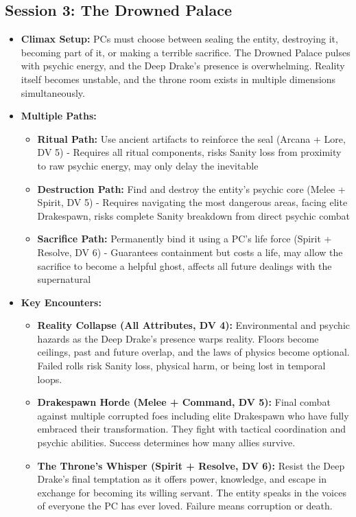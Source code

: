 \documentclass[11pt]{article}
\begin{document}
\subsection{Session 3: The Drowned Palace}
\begin{itemize}
\item \textbf{Climax Setup:} PCs must choose between sealing the entity, destroying it, becoming part of it, or making a terrible sacrifice. The Drowned Palace pulses with psychic energy, and the Deep Drake's presence is overwhelming. Reality itself becomes unstable, and the throne room exists in multiple dimensions simultaneously.
\item \textbf{Multiple Paths:}
  \begin{itemize}
  \item \textbf{Ritual Path:} Use ancient artifacts to reinforce the seal (Arcana + Lore, DV 5) - Requires all ritual components, risks Sanity loss from proximity to raw psychic energy, may only delay the inevitable
  \item \textbf{Destruction Path:} Find and destroy the entity's psychic core (Melee + Spirit, DV 5) - Requires navigating the most dangerous areas, facing elite Drakespawn, risks complete Sanity breakdown from direct psychic combat
  \item \textbf{Sacrifice Path:} Permanently bind it using a PC's life force (Spirit + Resolve, DV 6) - Guarantees containment but costs a life, may allow the sacrifice to become a helpful ghost, affects all future dealings with the supernatural
  \end{itemize}
\item \textbf{Key Encounters:}
  \begin{itemize}
  \item \textbf{Reality Collapse (All Attributes, DV 4):} Environmental and psychic hazards as the Deep Drake's presence warps reality. Floors become ceilings, past and future overlap, and the laws of physics become optional. Failed rolls risk Sanity loss, physical harm, or being lost in temporal loops.
  \item \textbf{Drakespawn Horde (Melee + Command, DV 5):} Final combat against multiple corrupted foes including elite Drakespawn who have fully embraced their transformation. They fight with tactical coordination and psychic abilities. Success determines how many allies survive.
  \item \textbf{The Throne's Whisper (Spirit + Resolve, DV 6):} Resist the Deep Drake's final temptation as it offers power, knowledge, and escape in exchange for becoming its willing servant. The entity speaks in the voices of everyone the PC has ever loved. Failure means corruption or death.

\end{itemize}
\end{itemize}
\end{document}
